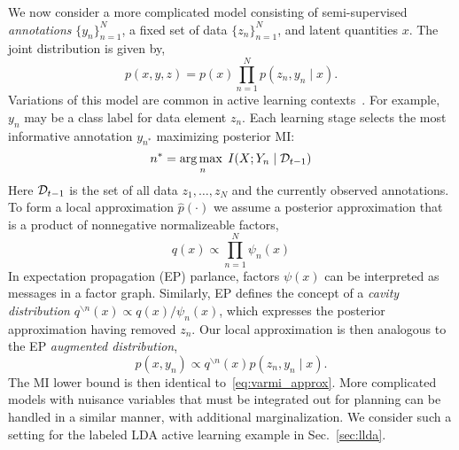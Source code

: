 We now consider a more complicated model consisting of semi-supervised
\emph{annotations} $\{y_n\}_{n=1}^N$, a fixed set of data $\{z_n\}_{n=1}^N$,
and latent quantities $x$.  The joint distribution is given by,
\[
  p(x,y,z) = p(x) \prod_{n=1}^N p(z_n, y_n \mid x).
\]
Variations of this model are common
in active learning contexts~\citep{settles2012active}.  For example,
$y_n$ may be a class label for data element $z_n$.  Each learning
stage selects the most informative annotation $y_{n^*}$ maximizing
posterior MI:
\begin{equation}
  n^{*} = \operatorname*{arg\,max\;}_n I(X;Y_n \mid \mathcal{D}_{t-1})
\end{equation}
Here $\mathcal{D}_{t-1}$ is the set of all data $z_1,\ldots,z_N$ and the
currently observed annotations.  To form a local approximation
$\hat{p}(\cdot)$ we assume a posterior approximation that is a product
of nonnegative normalizeable factors,
\begin{equation}
 q(x) \propto \prod_{n=1}^N \psi_n(x)
\end{equation}
In expectation propagation (EP) parlance, factors $\psi(x)$ can be
interpreted as messages in a factor graph.  Similarly, EP defines the
concept of a \emph{cavity distribution} $q^{\backslash n}(x) \propto
q(x) / \psi_n(x)$, which expresses the posterior approximation having
removed $z_n$.  Our local approximation is then analogous to the EP
\emph{augmented distribution},
\begin{equation}
  \hat{p}(x, y_n) \propto q^{\backslash n}(x) p(z_n, y_n \mid x).
\end{equation}
The MI lower bound is then identical to~\eqref{eq:varmi_approx}.  More
complicated models with nuisance variables that must be integrated out
for planning can be handled in a similar manner, with additional
marginalization.  We consider such a setting for the labeled LDA
active learning example in Sec.~\ref{sec:llda}.


